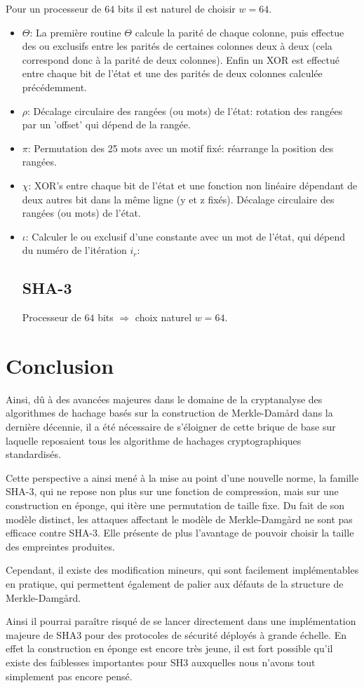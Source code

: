 \documentclass[10.5pt, a4paper, twoside, openright]{report}
\begin{document}
Pour un processeur de $64$ bits il est naturel de choisir $w=64$.
\begin{itemize}
\item{$\Theta$:
La première routine $\Theta$ calcule la parité de chaque colonne, puis effectue des ou exclusifs entre les parités de certaines colonnes deux à deux (cela correspond donc à la parité de deux colonnes).
Enfin un XOR est effectué entre chaque bit de l'état et une des parités de deux colonnes calculée précédemment. 
}

\item{$\rho$: 
Décalage circulaire des rangées (ou mots) de l'état: rotation des rangées par un 'offset' qui dépend de la rangée.}
\item{$\pi$: 
Permutation des 25 mots avec un motif fixé: réarrange la position des rangées.}
\item{$\chi$: 
XOR's entre chaque bit de l'état et une fonction non linéaire dépendant de deux autres bit dans la même ligne (y et z fixés).
Décalage circulaire des rangées (ou mots) de l'état.}
\item{$\iota$:
Calculer le ou exclusif d’une constante avec un mot de l’état, qui dépend du numéro de l’itération $i_r$:}

\section{SHA-3}
  Processeur de $64$ bits $\Rightarrow$ choix naturel $w=64$.
\end{itemize}
\chapter{Conclusion}

Ainsi, dû à des avancées majeures dans le domaine de la cryptanalyse des algorithmes de hachage basés sur la construction de Merkle-Dam\r{a}rd dans la dernière décennie, il a été nécessaire de s'éloigner de cette brique de base sur laquelle reposaient tous les algorithme de hachages cryptographiques standardisés.

Cette perspective a ainsi mené à la mise au point d'une nouvelle norme, la famille SHA-3, qui ne repose non plus sur une fonction de compression, mais sur une construction en éponge, qui itère une permutation de taille fixe. Du fait de son modèle distinct, les attaques affectant le modèle de Merkle-Damg\r{a}rd ne sont pas efficace contre SHA-3. Elle présente de plus l'avantage de pouvoir choisir la taille des empreintes produites. 

Cependant, il existe des modification mineurs, qui sont facilement implémentables en pratique, qui permettent également de palier aux défauts de la structure de Merkle-Damg\r{a}rd.

Ainsi il pourrai paraître risqué de se lancer directement dans une implémentation majeure de SHA3 pour des protocoles de sécurité déployés à grande échelle.
En effet la construction en éponge est encore très jeune, il est fort possible qu'il existe des faiblesses importantes pour SH3 auxquelles nous n'avons tout simplement pas encore pensé.
\end{document}

